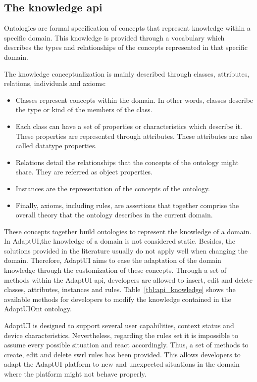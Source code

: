 \subsection{The knowledge \ac{api}}
\label{sec:knowledge_api}

Ontologies are formal specification of concepts that represent knowledge within
a specific domain. This knowledge is provided through a vocabulary which describes
the types and relationships of the concepts represented in that specific domain.

The knowledge conceptualization is mainly described through classes, attributes,
relations, individuals and axioms: 

\begin{itemize}
  \item Classes represent concepts within the domain. In other words, classes
  describe the type or kind of the members of the class.
  
  \item Each class can have a set of properties or characteristics which describe
  it. These properties are represented through attributes. These attributes
  are also called datatype properties.
  
  \item Relations detail the relationships that the concepts of the ontology
  might share. They are referred as object properties.
  \item Instances are the representation of the concepts of the
  ontology.
  
  \item Finally, axioms, including rules, are assertions that together comprise
  the overall theory that the ontology describes in the current domain.
\end{itemize}

These concepts together build ontologies to represent the knowledge of a domain.
In AdaptUI,the knowledge of a domain is not considered static. Besides, the 
solutions provided in the literature usually do not apply well when changing 
the domain. Therefore, AdaptUI aims to ease the adaptation of the domain 
knowledge through the customization of these concepts. Through a set of methods 
within the AdaptUI \ac{api}, developers are allowed to insert, edit and delete 
classes, attributes, instances and rules. Table~\ref{tbl:api_knowledge} shows 
the available methods for developers to modify the knowledge contained in the 
AdaptUIOnt ontology.

AdaptUI is designed to support several user capabilities, context status and
device characteristics. Nevertheless, regarding the rules set it is impossible
to assume every possible situation and react accordingly. Thus, a set of methods
to create, edit and delete \ac{swrl} rules has been provided. This allows developers
to adapt the AdaptUI platform to new and unexpected situations in the domain
where the platform might not behave properly.

